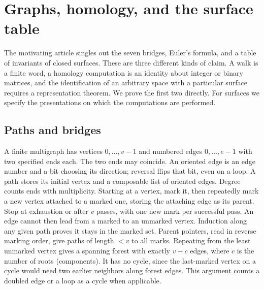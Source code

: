 \section{Graphs, homology, and the surface table}
\label{sec:algtop}
The motivating article singles out the seven bridges, Euler's formula, and a
table of invariants of closed surfaces. These are three different kinds of
claim. A walk is a finite word, a homology computation is an identity about
integer or binary matrices, and the identification of an arbitrary space
with a particular surface requires a representation theorem. We prove the
first two directly. For surfaces we specify the presentations on which the
computations are performed.

\subsection{Paths and bridges}
A finite multigraph has vertices $0,\ldots,v-1$ and numbered edges
$0,\ldots,e-1$ with two specified ends each. The two ends may coincide.
An oriented edge is an edge number and a bit choosing its direction;
reversal flips that bit, even on a loop. A path stores its initial vertex
and a composable list of oriented edges. Degree counts ends with
multiplicity. Starting at a vertex, mark it, then repeatedly mark a new
vertex attached to a marked one, storing the attaching edge as its parent.
Stop at exhaustion or after $v$ passes, with one new mark per successful
pass. An edge cannot then lead from a marked to an unmarked vertex.
Induction along any given path proves it stays in the marked set. Parent
pointers, read in reverse marking order, give paths of length $<v$ to all
marks. Repeating from the least unmarked vertex gives a spanning forest
with exactly $v-c$ edges, where $c$ is the number of roots (components).
It has no cycle, since the last-marked vertex on a cycle would need two
earlier neighbors along forest edges. This argument counts a doubled edge
or a loop as a cycle when applicable.

